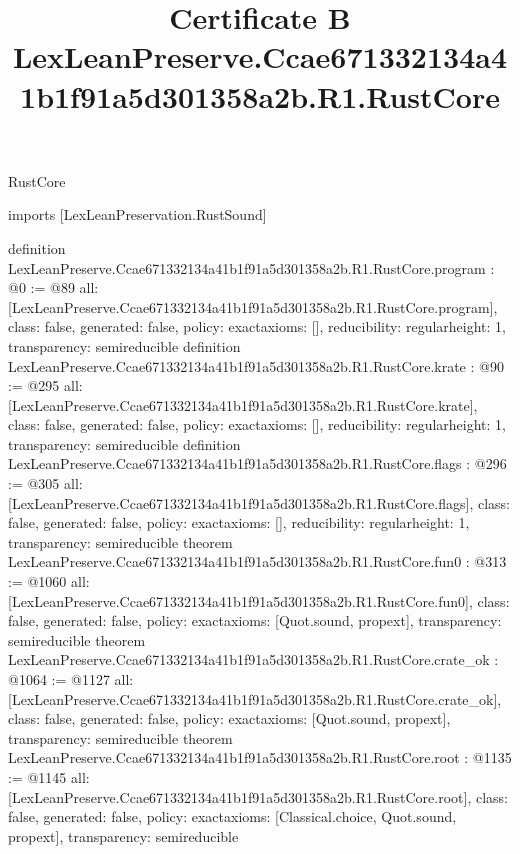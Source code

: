 \begin{lexlean}{RustCore}
\title{Certificate B LexLeanPreserve.Ccae671332134a41b1f91a5d301358a2b.R1.RustCore}
\begin{coremodule}
imports [LexLeanPreservation.RustSound]

definition LexLeanPreserve.Ccae671332134a41b1f91a5d301358a2b.R1.RustCore.program : @0 := @89 {
  all: [LexLeanPreserve.Ccae671332134a41b1f91a5d301358a2b.R1.RustCore.program],
  class: false,
  generated: false,
  policy: exact{axioms: []},
  reducibility: regular{height: 1},
  transparency: semireducible
}
definition LexLeanPreserve.Ccae671332134a41b1f91a5d301358a2b.R1.RustCore.krate : @90 := @295 {
  all: [LexLeanPreserve.Ccae671332134a41b1f91a5d301358a2b.R1.RustCore.krate],
  class: false,
  generated: false,
  policy: exact{axioms: []},
  reducibility: regular{height: 1},
  transparency: semireducible
}
definition LexLeanPreserve.Ccae671332134a41b1f91a5d301358a2b.R1.RustCore.flags : @296 := @305 {
  all: [LexLeanPreserve.Ccae671332134a41b1f91a5d301358a2b.R1.RustCore.flags],
  class: false,
  generated: false,
  policy: exact{axioms: []},
  reducibility: regular{height: 1},
  transparency: semireducible
}
theorem LexLeanPreserve.Ccae671332134a41b1f91a5d301358a2b.R1.RustCore.fun0 : @313 := @1060 {
  all: [LexLeanPreserve.Ccae671332134a41b1f91a5d301358a2b.R1.RustCore.fun0],
  class: false,
  generated: false,
  policy: exact{axioms: [Quot.sound, propext]},
  transparency: semireducible
}
theorem LexLeanPreserve.Ccae671332134a41b1f91a5d301358a2b.R1.RustCore.crate_ok : @1064 := @1127 {
  all: [LexLeanPreserve.Ccae671332134a41b1f91a5d301358a2b.R1.RustCore.crate_ok],
  class: false,
  generated: false,
  policy: exact{axioms: [Quot.sound, propext]},
  transparency: semireducible
}
theorem LexLeanPreserve.Ccae671332134a41b1f91a5d301358a2b.R1.RustCore.root : @1135 := @1145 {
  all: [LexLeanPreserve.Ccae671332134a41b1f91a5d301358a2b.R1.RustCore.root],
  class: false,
  generated: false,
  policy: exact{axioms: [Classical.choice, Quot.sound, propext]},
  transparency: semireducible
}


\end{coremodule}
\end{lexlean}
